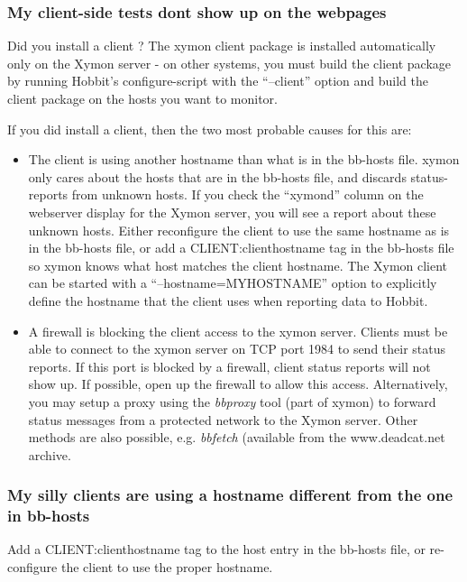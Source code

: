  
\subsubsection{My client-side tests dont show up on the webpages}


 Did you install a client ? The xymon client package is installed automatically only on the Xymon server - on other systems, you must build the client package by running Hobbit's configure-script with the ``--client'' option and build the client package on the hosts you want to monitor.


 If you did install a client, then the two most probable causes for this are:
\begin{itemize}
\item The client is using another hostname than what is in the bb-hosts file. 
 xymon only cares about the hosts that are in the bb-hosts file, and discards status-reports from unknown hosts. If you check the ``xymond'' column on the webserver display for the Xymon server, you will see a report about these unknown hosts. 
 Either reconfigure the client to use the same hostname as is in the bb-hosts file, or add a CLIENT:clienthostname tag in the bb-hosts file so xymon knows what host matches the client hostname. The Xymon client can be started with a ``--hostname=MYHOSTNAME'' option to explicitly define the hostname that the client uses when reporting data to Hobbit.
\item A firewall is blocking the client access to the xymon server. 
 Clients must be able to connect to the xymon server on TCP port 1984 to send their status reports. If this port is blocked by a firewall, client status reports will not show up. 
 If possible, open up the firewall to allow this access. Alternatively, you may setup a proxy using the \emph{bbproxy}
 tool (part of xymon) to forward status messages from a protected network to the Xymon server. 
 Other methods are also possible, e.g. \emph{bbfetch}
 (available from the www.deadcat.net archive. 

\end{itemize}
 
\subsubsection{My silly clients are using a hostname different from the one in bb-hosts}


 Add a CLIENT:clienthostname tag to the host entry in the bb-hosts file, or re-configure the client to use the proper hostname.
 
